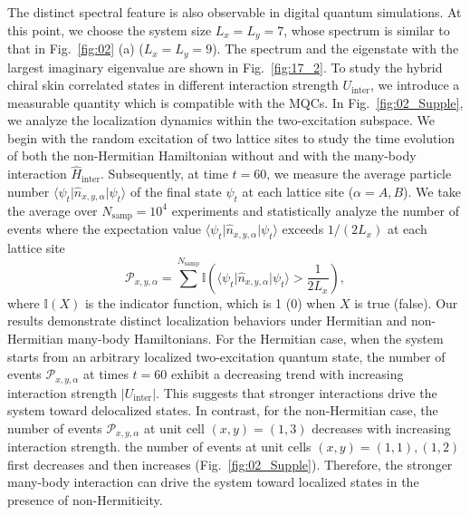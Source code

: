 \documentclass[longbibliography, aps, prx, amsmath, amssymb, amsfonts, twocolumn,superscriptaddress, footinbib]{revtex4-1}
\begin{document}
	The distinct spectral feature is also observable in digital quantum simulations. At this point, we choose the system size $L_x=L_y=7$, whose spectrum is similar to that in Fig.~\ref{fig:02} (a) ($L_x=L_y=9$). The spectrum and the eigenstate with the largest imaginary eigenvalue are shown in Fig.~\ref{fig:17_2}.
	To study the hybrid chiral skin correlated states in different interaction strength $U_{\text{inter}}$, we introduce a measurable quantity which is compatible with the MQCs. %
	In Fig.~\ref{fig:02_Supple}, we analyze the localization dynamics within the two-excitation subspace.
    We begin with the random excitation of two lattice sites to
	study the time evolution of both the non-Hermitian Hamiltonian without and with the many-body interaction $\hat{H}_{\text{inter}}$. 
	Subsequently, at time $t=60$, we measure the average particle number $\langle \psi_{t} \vert \hat{n}_{x,y,\alpha} \vert \psi_t \rangle$ of the final state $\psi_t$ at each lattice site ($\alpha=A,B$). We take the average over $N_{\text{samp}}=10^4$ experiments and statistically analyze the number of events where the expectation value $\langle \psi_{t} \vert \hat{n}_{x,y,\alpha} \vert \psi_t \rangle$ exceeds $1/(2L_x)$ at each lattice site
	\begin{equation}
		\mathcal{P}_{{x}, {y}, {\alpha}} = \sum^{N_{\text{samp}}} \mathbb{I}(\langle \psi_{t} \vert \hat{n}_{x,y,\alpha} \vert \psi_t \rangle > \frac{1}{2L_x}), \label{eq:NumbEvent}
	\end{equation}
	where $\mathbb{I}(X)$ is the indicator function, which is 1 (0) when $X$ is true (false).
	Our results demonstrate distinct localization behaviors under Hermitian and non-Hermitian many-body Hamiltonians. For the Hermitian case, when the system starts from an arbitrary localized two-excitation quantum state, the number of events $\mathcal{P}_{x,y,\alpha}$ at times $t=60$ exhibit a decreasing trend with increasing interaction strength $\vert U_{\text{inter}} \vert$. This suggests that stronger interactions drive the system toward delocalized states.
	In contrast, for the non-Hermitian case, the number of events $\mathcal{P}_{x,y,\alpha}$ at unit cell $(x,y)=(1,3)$ decreases with increasing interaction strength. the number of events at unit cells $(x,y)=(1,1),(1,2)$ first decreases and then increases (Fig.~\ref{fig:02_Supple}). 
	Therefore, the stronger many-body interaction can drive the system toward localized states in the presence of non-Hermiticity.
\end{document}

